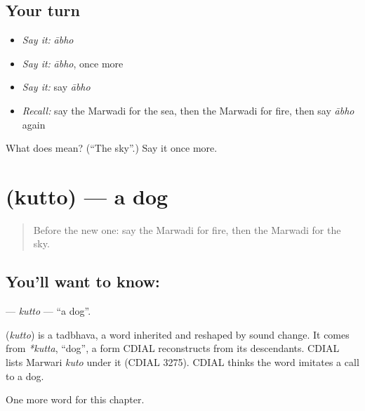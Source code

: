 \subsection*{Your turn}
\begin{itemize}
\raggedright
  \item \emph{Say it:} \emph{ābho}
  \item \emph{Say it:} \emph{ābho}, once more
  \item \emph{Say it:} say \emph{ābho}
  \item \emph{Recall:} say the Marwadi for the sea, then the Marwadi for fire, then say \emph{ābho} again
\end{itemize}

\begin{tcolorbox}[breakable,colback=teal!4,colframe=teal!35!black,title={Before you move on}]
What does  mean? (\textquotedblleft{}The sky\textquotedblright{}.) Say it once more.
\end{tcolorbox}
\section[\texorpdfstring{\mw{कुत्तो} (kutto)}{कुत्तो (kutto)}]{ (kutto) — a dog}

\label{lesson:MW-C70-kutto}



\begin{quote}
Before the new one: say the Marwadi for fire, then the Marwadi for the sky.
\end{quote}

\subsection*{You'll want to know: }
\textbf{} — \emph{kutto} — \textquotedblleft{}a dog\textquotedblright{}.

\begin{cousinweb}
\textbf{} (\emph{kutto}) is a tadbhava, a word inherited and reshaped by sound change. It comes from \emph{*kutta}, \textquotedblleft{}dog\textquotedblright{}, a form CDIAL reconstructs from its descendants. CDIAL lists Marwari \emph{kuto} under it (CDIAL 3275). CDIAL thinks the word imitates a call to a dog.
\end{cousinweb}

\begin{grammarlens}[title={What you've built}]
One more word for this chapter.
\end{grammarlens}

